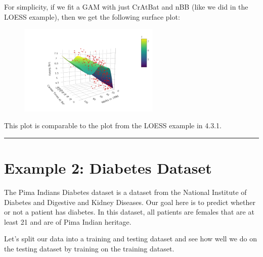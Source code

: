 \documentclass{article}\usepackage[]{graphicx}\usepackage[]{color}
\begin{document}
For simplicity, if we fit a GAM with just CrAtBat and nBB (like we did in the LOESS example), then we get the following surface plot:

\begin{figure}[H]
	\centering
	\includegraphics[width=0.6\textwidth]{gam_baseball_demo_mgcv.png}
	\label{fig:myfig}
\end{figure}

This plot is comparable to the plot from the LOESS example in 4.3.1.

\bigskip
\hrule
\bigskip

\section*{Example 2: Diabetes Dataset}

The Pima Indians Diabetes dataset is a dataset from the National Institute of Diabetes and Digestive and Kidney Diseases. Our goal here is to predict whether or not a patient has diabetes. In this dataset, all patients are females that are at least 21 and are of Pima Indian heritage.

Let's split our data into a training and testing dataset and see how well we do on the testing dataset by training on the training dataset.
\end{document}
